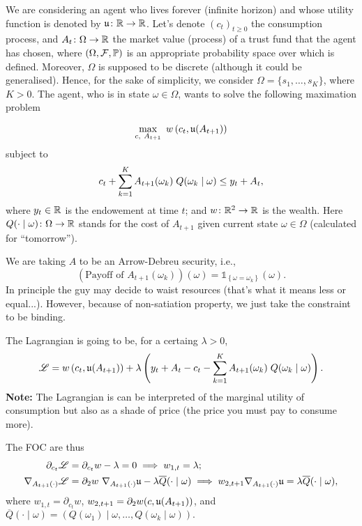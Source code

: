 We are considering an agent who lives forever (infinite horizon) and whose utility function is denoted by $\mathfrak{u}\colon\mathbb{R}\to\mathbb{R}$. Let's denote $(c_t)_{t\geq 0}$ the consumption process, and $A_t\colon\Omega\to\mathbb{R}$ the market value (process) of a trust fund that the agent has chosen, where $(\Omega, \mathcal{F}, \mathbb{P})$ is an appropriate probability space over which is defined. Moreover, $\Omega$ is supposed to be discrete (although it could be generalised). Hence, for the sake of simplicity, we consider $\Omega = \{s_1,\ldots, s_K\}$, where $K>0$. The agent, who is in state $\omega\in\Omega$, wants to solve the following maximation problem

\begin{equation}
	\max_{c, \ A_{t+1}} \ w \left(c_t,\mathfrak{u}(A_{t+1})\right)
\end{equation}
subject to
$$
	c_t + \sum_{k=1}^K A_{t+1}(\omega_{k}) \hspace{0.1cm}Q(\omega_k\mid \omega)\leq  y_t + A_t,
$$
where $y_t\in\mathbb{R}$ is the endowement at time $t$; and $w\colon\mathbb{R}^2\to\mathbb{R}$ is the wealth. Here $Q(\cdot\mid\omega)\colon\Omega\to\mathbb{R}$ stands for the cost of $A_{t+1}$ given current state $\omega\in\Omega$ (calculated for ``tomorrow'').

We are taking $A$ to be an Arrow-Debreu security, i.e., 
$$
	\left(\text{Payoff of } A_{t+1}(\omega_k)\right)(\omega) = \mathds{1}_{\left\{ \omega= \omega_k\right\}}(\omega).
$$
In principle the guy may decide to waist resources (that's what it means less or equal...). However, because of non-satiation property, we just take the constraint to be binding. 

The Lagrangian is going to be, for a certaing $\lambda > 0$,
\begin{equation}
	\mathscr{L} = w \left(c_t, \mathfrak{u}(A_{t+1})\right) + \lambda\left(y_t+A_t - c_t - \sum_{k=1}^K A_{t+1}(\omega_k) \hspace{0.1cm}Q(\omega_k\mid \omega)\right).
\end{equation}
\noindent \textbf{Note:} The Lagrangian is can be interpreted of  the marginal utility of consumption but also as a shade of price (the price you must pay to consume more).

The FOC are thus
$$
	\begin{aligned}
		\partial_{c_t}\L 	& = \partial_{c_t} w - \lambda = 0 \implies w_{1,t} = \lambda;\\
		\nabla_{A_{t+1}(\cdot)}\L 	&= \partial_2 w \ \nabla_{A_{t+1}(\cdot)} \u - \lambda \overline{Q}(\cdot\mid \omega)\implies  w_{2,t+1}  \nabla_{A_{t+1}(\cdot)} \u = \lambda \overline{Q}(\cdot\mid \omega),
	\end{aligned}
$$
where $w_{1,t} = \partial_{c_t} w$, $w_{2,t+1} = \partial_2w(c,\mathfrak{u}(A_{t+1}))$, and $\overline{Q}(\cdot\mid \omega) = (Q(\omega_1)\mid\omega, \ldots, Q(\omega_k\mid \omega)).$


